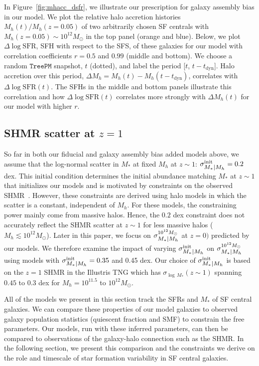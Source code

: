 \documentclass[12pt, letterpaper, preprint, tighten]{aastex62}
\newcommand{\logsfr}{\log\mathrm{SFR}}
\newcommand{\siglogm}{\sigma_{\scaleto{M_*|M_h}{8pt}}}
\begin{document}
In Figure~\ref{fig:mhacc_dsfr}, we illustrate our prescription for galaxy
assembly bias in our model. We plot the relative halo accretion histories
$M_h(t)/M_h(z{=}0.05)$ of two arbitrarily chosen SF centrals with
$M_h(z{=}0.05)\sim10^{12}M_\odot$ in the top panel (orange and blue). Below, we plot
$\Delta\logsfr$, SFH with respect to the SFS, of these galaxies for our model with
correlation coefficients $r=0.5$ and $0.99$ (middle and bottom). We choose a
random $\mathtt{TreePM}$ snapshot, $t$ (dotted), and label the period
[$t$, $t - t_\mathrm{dyn}$]. Halo accretion over this period,
$\Delta M_h = M_h(t) - M_h(t-t_\mathrm{dyn})$, correlates with $\Delta\logsfr(t)$.
The SFHs in the middle and bottom panels illustrate this correlation and how
$\Delta\logsfr(t)$ correlates more strongly with $\Delta M_h(t)$ for our model
with higher $r$.

\subsection{SHMR scatter at $z=1$} \label{sec:siglogm_init}
So far in both our fiducial and galaxy assembly bias added models above, 
we assume that the log-normal scatter in $M_*$ at fixed $M_h$ at $z\sim1$:
$\siglogm^{\rm init} = 0.2$ dex. This initial condition determines
the initial abundance matching $M_*$ at $z\sim1$ that initializes our models and is motivated
by constraints on the observed SHMR~\citep[\emph{e.g.}][]{leauthaud2012, tinker2013, patel2015}. 
However, these constraints are derived using halo models in which the scatter 
is a constant, independent of $M_h$. For these models, the constraining power 
mainly come from massive halos. Hence, the $0.2$ dex constraint does not 
accurately reflect the SHMR scatter at $z\sim1$ for less massive halos 
($M_h \lesssim 10^{12}M_\odot$). Later in this paper, we focus on 
$\siglogm^{10^{12}M_\odot}$ at $z=0)$ predicted by our models. We 
therefore examine the impact of varying $\siglogm^{\rm init}$ on 
$\siglogm^{10^{12}M_\odot}$ using models with $\siglogm^{\rm init} = 0.35$ and 0.45 dex. 
Our choice of $\siglogm^{\rm init}$ is
based on the $z=1$ SHMR in the Illustris TNG which has $\sigma_{\log\,M_*}(z\sim1)$
spanning $0.45$ to $0.3$ dex for $M_h = 10^{11.5}$ to $10^{12}M_\odot$.

All of the models we present in this section track the SFRs and $M_*$ of SF
central galaxies. We can compare these properties of our model galaxies
to observed galaxy population statistics (quiescent fraction and SMF) to
constrain the free parameters. Our models, run with these inferred parameters, 
can then be compared to observations of the galaxy-halo connection such as the 
SHMR. In the following section, we present this comparison and the constraints 
we derive on the role and timescale of star formation variability in SF central 
galaxies.
\end{document}
